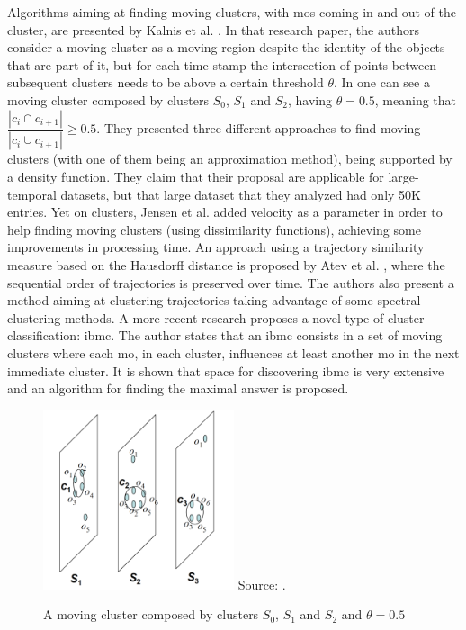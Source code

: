 Algorithms aiming at finding moving clusters, with \acp{mo} coming in and out of the cluster, are presented by Kalnis et
al.  \citep{movingclusters}. In that research paper, the authors consider a moving cluster as a moving region despite
the identity of the objects that are part of it, but for each time stamp the intersection of points between subsequent
clusters needs to be above a certain threshold $\theta$. In  one can see a moving cluster composed
by clusters $S_0$, $S_1$ and $S_2$, having $\theta=0.5$, meaning that $\dfrac{|c_i \cap c_{i+1}|}{|c_i \cup c_{i+1}|}
\geq 0.5$. They presented three different approaches to find moving clusters (with one of them being an approximation
method), being supported by a density function. They claim that their proposal are applicable for large-temporal
datasets, but that large dataset that they analyzed had only 50K entries. Yet on clusters, Jensen et al.
\citep{clusters3} added velocity as a parameter in order to help finding moving clusters (using dissimilarity
functions), achieving some improvements in processing time. An approach using a trajectory similarity measure based on
the Hausdorff distance is proposed by Atev et al. \citep{clusters2}, where the sequential order of trajectories is
preserved over time. The authors also present a method aiming at clustering trajectories taking advantage of some
spectral clustering methods. A more recent research \citep{clusters1} proposes a novel type of cluster classification:
\ac{ibmc}. The author states that an \ac{ibmc} consists in a set of moving clusters where each \ac{mo}, in each cluster,
influences at least another \ac{mo} in the next immediate cluster. It is shown that space for discovering \ac{ibmc} is
very extensive and an algorithm for finding the maximal answer is proposed.

\begin{figure}
    \centering
    \caption{A moving cluster composed by clusters $S_0$, $S_1$ and $S_2$ and $\theta=0.5$}
    \includegraphics[width=0.5\textwidth]{images/clusters.png}
    \footnotesize{Source: \citep{movingclusters}.}
    \label{fig:clusters}
\end{figure}

